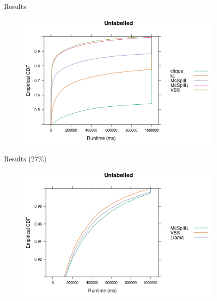 \documentclass{beamer}
\begin{document}
\begin{frame}{Results}
  \begin{figure}
    \centering
    \includegraphics[width=0.9\textwidth]{../dissertation/images/ecdf_unlabelled.png}
  \end{figure}
\end{frame}

\begin{frame}{Results (27\%)}
  \begin{figure}
    \centering
    \includegraphics[width=0.9\textwidth]{../dissertation/images/ecdf_unlabelled_llama.png}
  \end{figure}
\end{frame}
\end{document}
